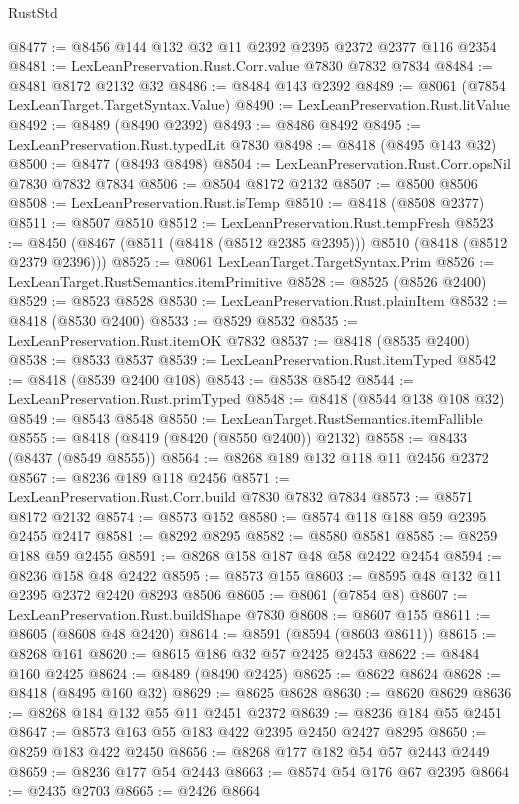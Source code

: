 \begin{lexlean}{RustStd}
\begin{coremodule}
{\begin{coremodule}
{{{{{{{{{{{{{{{{{{{{{{{{{{{{{{{{{{{{{@8477 := @8456 @144 @132 @32 @11 @2392 @2395 @2372 @2377 @116 @2354
@8481 := LexLeanPreservation.Rust.Corr.value @7830 @7832 @7834
@8484 := @8481 @8172 @2132 @32
@8486 := @8484 @143 @2392
@8489 := @8061 (@7854 LexLeanTarget.TargetSyntax.Value)
@8490 := LexLeanPreservation.Rust.litValue
@8492 := @8489 (@8490 @2392)
@8493 := @8486 @8492
@8495 := LexLeanPreservation.Rust.typedLit @7830
@8498 := @8418 (@8495 @143 @32)
@8500 := @8477 (@8493 @8498)
@8504 := LexLeanPreservation.Rust.Corr.opsNil @7830 @7832 @7834
@8506 := @8504 @8172 @2132
@8507 := @8500 @8506
@8508 := LexLeanPreservation.Rust.isTemp
@8510 := @8418 (@8508 @2377)
@8511 := @8507 @8510
@8512 := LexLeanPreservation.Rust.tempFresh
@8523 := @8450 (@8467 (@8511 (@8418 (@8512 @2385 @2395))) @8510 (@8418 (@8512 @2379 @2396)))
@8525 := @8061 LexLeanTarget.TargetSyntax.Prim
@8526 := LexLeanTarget.RustSemantics.itemPrimitive
@8528 := @8525 (@8526 @2400)
@8529 := @8523 @8528
@8530 := LexLeanPreservation.Rust.plainItem
@8532 := @8418 (@8530 @2400)
@8533 := @8529 @8532
@8535 := LexLeanPreservation.Rust.itemOK @7832
@8537 := @8418 (@8535 @2400)
@8538 := @8533 @8537
@8539 := LexLeanPreservation.Rust.itemTyped
@8542 := @8418 (@8539 @2400 @108)
@8543 := @8538 @8542
@8544 := LexLeanPreservation.Rust.primTyped
@8548 := @8418 (@8544 @138 @108 @32)
@8549 := @8543 @8548
@8550 := LexLeanTarget.RustSemantics.itemFallible
@8555 := @8418 (@8419 (@8420 (@8550 @2400)) @2132)
@8558 := @8433 (@8437 (@8549 @8555))
@8564 := @8268 @189 @132 @118 @11 @2456 @2372
@8567 := @8236 @189 @118 @2456
@8571 := LexLeanPreservation.Rust.Corr.build @7830 @7832 @7834
@8573 := @8571 @8172 @2132
@8574 := @8573 @152
@8580 := @8574 @118 @188 @59 @2395 @2455 @2417
@8581 := @8292 @8295
@8582 := @8580 @8581
@8585 := @8259 @188 @59 @2455
@8591 := @8268 @158 @187 @48 @58 @2422 @2454
@8594 := @8236 @158 @48 @2422
@8595 := @8573 @155
@8603 := @8595 @48 @132 @11 @2395 @2372 @2420 @8293 @8506
@8605 := @8061 (@7854 @8)
@8607 := LexLeanPreservation.Rust.buildShape @7830
@8608 := @8607 @155
@8611 := @8605 (@8608 @48 @2420)
@8614 := @8591 (@8594 (@8603 @8611))
@8615 := @8268 @161
@8620 := @8615 @186 @32 @57 @2425 @2453
@8622 := @8484 @160 @2425
@8624 := @8489 (@8490 @2425)
@8625 := @8622 @8624
@8628 := @8418 (@8495 @160 @32)
@8629 := @8625 @8628
@8630 := @8620 @8629
@8636 := @8268 @184 @132 @55 @11 @2451 @2372
@8639 := @8236 @184 @55 @2451
@8647 := @8573 @163 @55 @183 @422 @2395 @2450 @2427 @8295
@8650 := @8259 @183 @422 @2450
@8656 := @8268 @177 @182 @54 @57 @2443 @2449
@8659 := @8236 @177 @54 @2443
@8663 := @8574 @54 @176 @67 @2395
@8664 := @2435 @2703
@8665 := @2426 @8664
}}}}}}}}}}}}}}}}}}}}}}}}}}}}}}}}}}}}}
\end{coremodule}}
\end{coremodule}
\end{lexlean}
